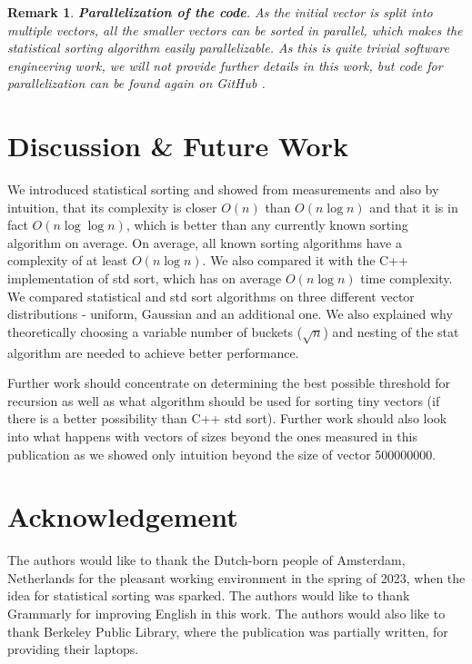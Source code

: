 \documentclass[12pt]{article}
\newtheorem*{remark}{Remark}
\begin{document}
        
    \begin{remark}
	
	\textbf{Parallelization of the code}. As the initial vector is split into multiple vectors, all the smaller vectors can be sorted in parallel, which makes the statistical sorting algorithm easily parallelizable. As this is quite trivial software engineering work, we will not provide further details in this work, but code for parallelization can be found again on GitHub \cite{peta78b}.
    \end{remark}

	\section{Discussion \& Future Work}
	
	We introduced statistical sorting and showed from measurements and also by intuition, that its complexity is closer $O(n)$ than $O(n \log n)$ and that it is in fact $O(n \log \log n)$, which is better than any currently known sorting algorithm on average. On average, all known sorting algorithms have a complexity of at least $O(n \log n)$. We also compared it with the C++ implementation of std sort, which has on average $O(n \log n)$ time complexity. We compared statistical and std sort algorithms on three different vector distributions - uniform, Gaussian and an additional one. We also explained why theoretically choosing a variable number of buckets ($\sqrt{n}$) and nesting of the stat algorithm are needed to achieve better performance.
	
	Further work should concentrate on determining the best possible threshold for recursion as well as what algorithm should be used for sorting tiny vectors (if there is a better possibility than C++ std sort). Further work should also look into what happens with vectors of sizes beyond the ones measured in this publication as we showed only intuition beyond the size of vector 500000000.
	
	\section*{Acknowledgement}
	
	The authors would like to thank the Dutch-born people of Amsterdam, Netherlands for the pleasant working environment in the spring of 2023, when the idea for statistical sorting was sparked. The authors would like to thank Grammarly for improving English in this work. The authors would also like to thank Berkeley Public Library, where the publication was partially written, for providing their laptops.
	
\end{document}
